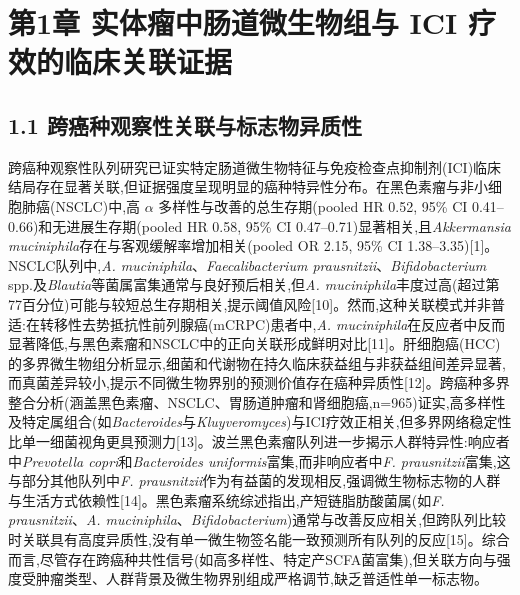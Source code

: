 \documentclass[11pt]{article}
\begin{document}
\section{第1章 实体瘤中肠道微生物组与 ICI 疗效的临床关联证据}\label{ux7b2c1ux7ae0-ux5b9eux4f53ux7624ux4e2dux80a0ux9053ux5faeux751fux7269ux7ec4ux4e0e-ici-ux7597ux6548ux7684ux4e34ux5e8aux5173ux8054ux8bc1ux636e}

\subsection{1.1 跨癌种观察性关联与标志物异质性}\label{ux8de8ux764cux79cdux89c2ux5bdfux6027ux5173ux8054ux4e0eux6807ux5fd7ux7269ux5f02ux8d28ux6027}

跨癌种观察性队列研究已证实特定肠道微生物特征与免疫检查点抑制剂(ICI)临床结局存在显著关联,但证据强度呈现明显的癌种特异性分布。在黑色素瘤与非小细胞肺癌(NSCLC)中,高 \(\alpha\) 多样性与改善的总生存期(pooled HR 0.52, 95\% CI 0.41--0.66)和无进展生存期(pooled HR 0.58, 95\% CI 0.47--0.71)显著相关,且\emph{Akkermansia muciniphila}存在与客观缓解率增加相关(pooled OR 2.15, 95\% CI 1.38--3.35){[}1{]}。NSCLC队列中,\emph{A. muciniphila}、\emph{Faecalibacterium prausnitzii}、\emph{Bifidobacterium} spp.及\emph{Blautia}等菌属富集通常与良好预后相关,但\emph{A. muciniphila}丰度过高(超过第77百分位)可能与较短总生存期相关,提示阈值风险{[}10{]}。然而,这种关联模式并非普适:在转移性去势抵抗性前列腺癌(mCRPC)患者中,\emph{A. muciniphila}在反应者中反而显著降低,与黑色素瘤和NSCLC中的正向关联形成鲜明对比{[}11{]}。肝细胞癌(HCC)的多界微生物组分析显示,细菌和代谢物在持久临床获益组与非获益组间差异显著,而真菌差异较小,提示不同微生物界别的预测价值存在癌种异质性{[}12{]}。跨癌种多界整合分析(涵盖黑色素瘤、NSCLC、胃肠道肿瘤和肾细胞癌,n=965)证实,高多样性及特定属组合(如\emph{Bacteroides}与\emph{Kluyveromyces})与ICI疗效正相关,但多界网络稳定性比单一细菌视角更具预测力{[}13{]}。波兰黑色素瘤队列进一步揭示人群特异性:响应者中\emph{Prevotella copri}和\emph{Bacteroides uniformis}富集,而非响应者中\emph{F. prausnitzii}富集,这与部分其他队列中\emph{F. prausnitzii}作为有益菌的发现相反,强调微生物标志物的人群与生活方式依赖性{[}14{]}。黑色素瘤系统综述指出,产短链脂肪酸菌属(如\emph{F. prausnitzii}、\emph{A. muciniphila}、\emph{Bifidobacterium})通常与改善反应相关,但跨队列比较时关联具有高度异质性,没有单一微生物签名能一致预测所有队列的反应{[}15{]}。综合而言,尽管存在跨癌种共性信号(如高多样性、特定产SCFA菌富集),但关联方向与强度受肿瘤类型、人群背景及微生物界别组成严格调节,缺乏普适性单一标志物。
\end{document}
